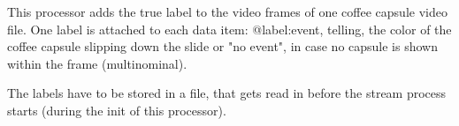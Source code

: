 This processor adds the true label to the video frames of one coffee capsule video file. One label is attached to each data item: @label:event, telling, the color of the coffee capsule slipping down the slide or "no event", in case no capsule is shown within the frame (multinominal).

The labels have to be stored in a file, that gets read in before the stream process starts (during the init of this processor).